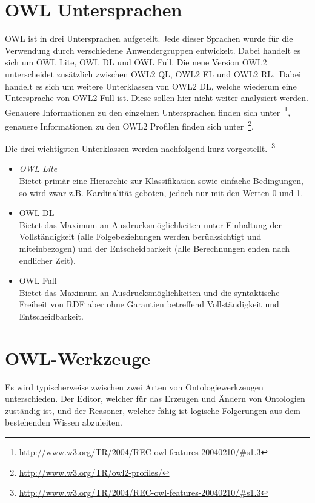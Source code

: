 \section{OWL Untersprachen}
\label{sec:owl_owl_Untersprachen}
OWL ist in drei Untersprachen aufgeteilt. Jede dieser Sprachen wurde für die Verwendung durch verschiedene Anwendergruppen entwickelt. Dabei handelt es sich um OWL Lite, OWL DL und OWL Full. Die neue Version OWL2 unterscheidet zusätzlich zwischen OWL2 QL, OWL2 EL und OWL2 RL.\ Dabei handelt es sich um weitere Unterklassen von OWL2 DL, welche wiederum eine Untersprache von OWL2 Full ist. Diese sollen hier nicht weiter analysiert werden. Genauere Informationen zu den einzelnen Untersprachen finden sich unter~\footnote{\url{http://www.w3.org/TR/2004/REC-owl-features-20040210/\#s1.3}}, genauere Informationen zu den OWL2 Profilen finden sich unter~\footnote{\url{http://www.w3.org/TR/owl2-profiles/}}.

Die drei wichtigsten Unterklassen werden nachfolgend kurz vorgestellt.~\footnote{\url{http://www.w3.org/TR/2004/REC-owl-features-20040210/\#s1.3}}
\begin{itemize}
	\item \textit{OWL Lite}\\
	Bietet primär eine Hierarchie zur Klassifikation sowie einfache Bedingungen, so wird zwar z.B. 				Kardinalität geboten, jedoch nur mit den Werten 0 und 1.
	\item{OWL DL}\\
	Bietet das Maximum an Ausdrucksmöglichkeiten unter Einhaltung der Vollständigkeit (alle Folgebeziehungen werden berücksichtigt und miteinbezogen) und der Entscheidbarkeit (alle Berechnungen enden nach endlicher Zeit).
	\item{OWL Full}\\
	Bietet das Maximum an Ausdrucksmöglichkeiten und die syntaktische Freiheit von RDF aber ohne Garantien betreffend Vollständigkeit und Entscheidbarkeit.
\end{itemize}


\section{OWL-Werkzeuge}
\label{sec:owl_owl_OwlTools}
Es wird typischerweise zwischen zwei Arten von Ontologiewerkzeugen unterschieden. Der Editor, welcher für das Erzeugen und Ändern von Ontologien zuständig ist, und der Reasoner, welcher fähig ist logische Folgerungen aus dem bestehenden Wissen abzuleiten.

